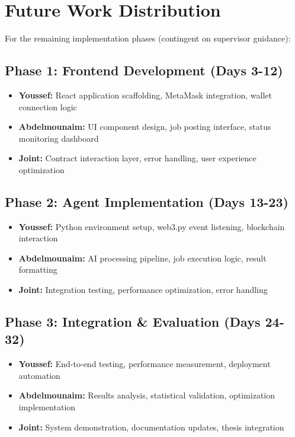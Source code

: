 \section{Future Work Distribution}

For the remaining implementation phases (contingent on supervisor guidance):

\subsection{Phase 1: Frontend Development (Days 3-12)}
\begin{itemize}
\item \textbf{Youssef:} React application scaffolding, MetaMask integration, wallet connection logic
\item \textbf{Abdelmounaim:} UI component design, job posting interface, status monitoring dashboard
\item \textbf{Joint:} Contract interaction layer, error handling, user experience optimization
\end{itemize}

\subsection{Phase 2: Agent Implementation (Days 13-23)}
\begin{itemize}
\item \textbf{Youssef:} Python environment setup, web3.py event listening, blockchain interaction
\item \textbf{Abdelmounaim:} AI processing pipeline, job execution logic, result formatting
\item \textbf{Joint:} Integration testing, performance optimization, error handling
\end{itemize}

\subsection{Phase 3: Integration \& Evaluation (Days 24-32)}
\begin{itemize}
\item \textbf{Youssef:} End-to-end testing, performance measurement, deployment automation
\item \textbf{Abdelmounaim:} Results analysis, statistical validation, optimization implementation
\item \textbf{Joint:} System demonstration, documentation updates, thesis integration
\end{itemize}

